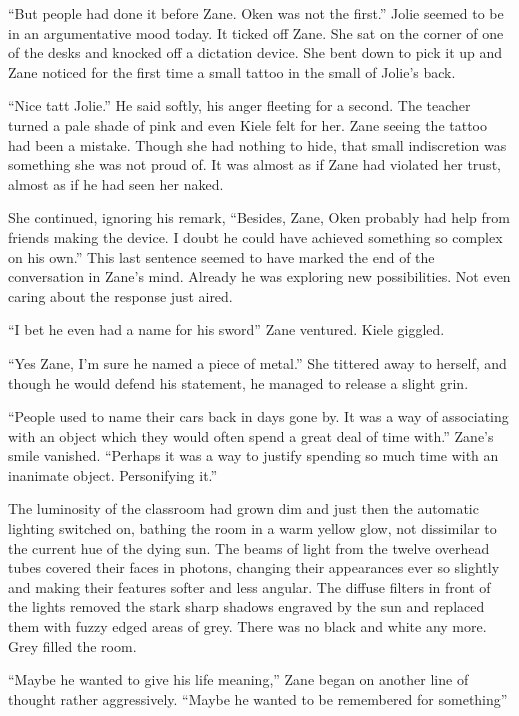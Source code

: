 ``But people had done it before Zane.  Oken was not the first.''  Jolie seemed to be in an argumentative mood today.  It ticked off Zane.  She sat on the corner of one of the desks and knocked off a dictation device.  She bent down to pick it up and Zane noticed for the first time a small tattoo in the small of Jolie's back.  

``Nice tatt Jolie.''  He said softly, his anger fleeting for a second.  The teacher turned a pale shade of pink and even Kiele felt for her.  Zane seeing the tattoo had been a mistake.  Though she had nothing to hide, that small indiscretion was something she was not proud of.  It was almost as if Zane had violated her trust, almost as if he had seen her naked.  

She continued, ignoring his remark, ``Besides, Zane, Oken probably had help from friends making the device.  I doubt he could have achieved something so complex on his own.''  This last sentence seemed to have marked the end of the conversation in Zane's mind.  Already he was exploring new possibilities.  Not even caring about the response just aired.

``I bet he even had a name for his sword''  Zane ventured.  Kiele giggled.  

``Yes Zane, I'm sure he named a piece of metal.''  She tittered away to herself, and though he would defend his statement, he managed to release a slight grin.

``People used to name their cars back in days gone by.  It was a way of associating with an object which they would often spend a great deal of time with.''  Zane's smile vanished.  ``Perhaps it was a way to justify spending so much time with an inanimate object.  Personifying it.''

The luminosity of the  classroom had grown dim and just then the automatic lighting switched on, bathing the room in a warm yellow glow, not dissimilar to the current hue of the dying sun.  The beams of light from the twelve overhead tubes covered their faces in photons, changing their appearances ever so slightly and making their features softer and less angular.  The diffuse filters in front of the lights removed the stark sharp shadows engraved by the sun and replaced them with fuzzy edged areas of grey.  There was no black and white any more.  Grey filled the room.

``Maybe he wanted to give his life meaning,'' Zane began on another line of thought rather aggressively.  ``Maybe he wanted to be remembered for something''

